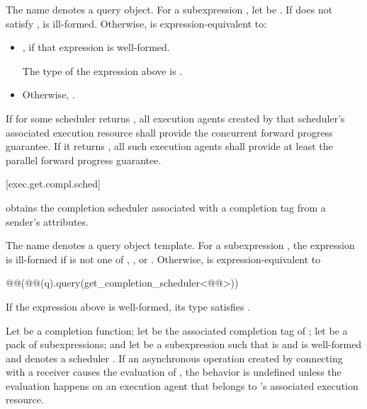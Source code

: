 \pnum
The name  denotes a query object.
For a subexpression , let  be .
If  does not satisfy ,
 is ill-formed.
Otherwise,
 is expression-equivalent to:
\begin{itemize}
\item
{},
if that expression is well-formed.

\mandates
The type of the expression above is .
\item
Otherwise, .
\end{itemize}

\pnum
If  for some scheduler 
returns ,
all execution agents created by that scheduler's associated execution resource
shall provide the concurrent forward progress guarantee.
If it returns ,
all such execution agents
shall provide at least the parallel forward progress guarantee.

[exec.get.compl.sched]{}

\pnum
{} obtains
the completion scheduler associated with a completion tag
from a sender's attributes.

\pnum
The name  denotes a query object template.
For a subexpression ,
the expression 
is ill-formed if  is not one of
, , or .
Otherwise, 
is expression-equivalent to
\begin{codeblock}
@@(@@(q).query(get_completion_scheduler<@@>))
\end{codeblock}
\mandates
If the expression above is well-formed,
its type satisfies .

\pnum
Let  be a completion function;
let  be
the associated completion tag of ;
let  be a pack of subexpressions; and
let  be a subexpression
such that  is  and
is well-formed and denotes a scheduler .
If an asynchronous operation
created by connecting  with a receiver 
causes the evaluation of ,
the behavior is undefined
unless the evaluation happens on an execution agent
that belongs to 's associated execution resource.

